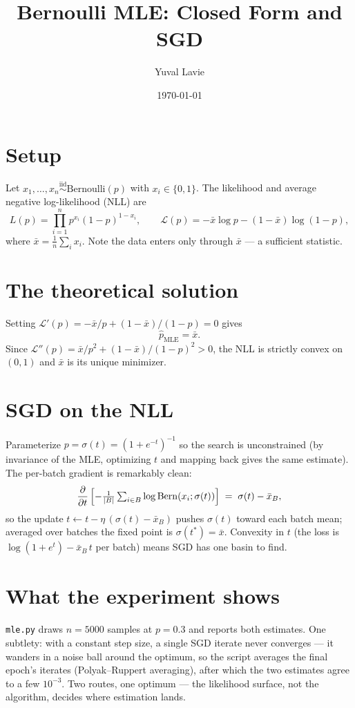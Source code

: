 \documentclass[11pt]{article}
\title{Bernoulli MLE: Closed Form and SGD}
\author{Yuval Lavie}
\date{\today}
\begin{document}
\maketitle

\section{Setup}

Let $x_1,\dots,x_n \overset{\text{iid}}{\sim} \mathrm{Bernoulli}(p)$ with
$x_i \in \{0,1\}$. The likelihood and average negative log-likelihood (NLL)
are
\begin{equation}
  L(p) = \prod_{i=1}^{n} p^{x_i}(1-p)^{1-x_i},
  \qquad
  \mathcal{L}(p) = -\bar{x}\log p - (1-\bar{x})\log(1-p),
\end{equation}
where $\bar{x} = \tfrac1n\sum_i x_i$. Note the data enters only through
$\bar{x}$ --- a sufficient statistic.

\section{The theoretical solution}

Setting $\mathcal{L}'(p) = -\bar{x}/p + (1-\bar{x})/(1-p) = 0$ gives
\begin{equation}
  \hat{p}_{\mathrm{MLE}} = \bar{x}.
\end{equation}
Since $\mathcal{L}''(p) = \bar{x}/p^2 + (1-\bar{x})/(1-p)^2 > 0$, the NLL is
strictly convex on $(0,1)$ and $\bar{x}$ is its unique minimizer.

\section{SGD on the NLL}

Parameterize $p = \sigma(t) = (1+e^{-t})^{-1}$ so the search is
unconstrained (by invariance of the MLE, optimizing $t$ and mapping back
gives the same estimate). The per-batch gradient is remarkably clean:
\begin{equation}
  \frac{\partial}{\partial t}\,
  \Bigl[-\tfrac1{|B|}\textstyle\sum_{i\in B} \log
  \mathrm{Bern}(x_i;\sigma(t))\Bigr]
  \;=\; \sigma(t) - \bar{x}_B ,
\end{equation}
so the update $t \leftarrow t - \eta\,(\sigma(t) - \bar{x}_B)$ pushes
$\sigma(t)$ toward each batch mean; averaged over batches the fixed point is
$\sigma(t^\ast) = \bar{x}$. Convexity in $t$ (the loss is
$\log(1+e^{t}) - \bar{x}_B\,t$ per batch) means SGD has one basin to find.

\section{What the experiment shows}

\texttt{mle.py} draws $n = 5000$ samples at $p = 0.3$ and reports both
estimates. One subtlety: with a constant step size, a single SGD iterate
never converges --- it wanders in a noise ball around the optimum, so the
script averages the final epoch's iterates (Polyak--Ruppert averaging),
after which the two estimates agree to a few $10^{-3}$. Two routes, one
optimum --- the likelihood surface, not the algorithm, decides where
estimation lands.
\end{document}
